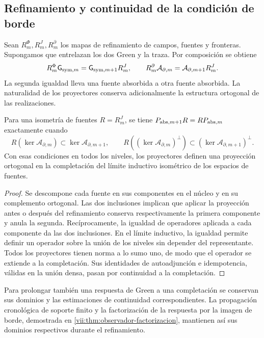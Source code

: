 \subsection{Refinamiento y continuidad de la condición de borde}
\label{vii:subsec:refinamiento-absorcion}

Sean \(R_m^\Phi,R_m^J,R_m^\partial\) los mapas de refinamiento de
campos, fuentes y fronteras. Supongamos que entrelazan los dos Green y la
traza. Por composición se obtiene
\begin{equation}
 R_m^\Phi \mathsf{G}_{{\rm sym},m}=\mathsf{G}_{{\rm sym},m+1}R_m^J,\qquad
 R_m^\partial\mathcal A_{\partial,m}
 =\mathcal A_{\partial,m+1}R_m^J.
 \label{vii:eq:refinamiento-lectura-absorcion}
\end{equation}
La segunda igualdad lleva una fuente absorbida a otra fuente absorbida.
La naturalidad de los proyectores conserva adicionalmente la estructura
ortogonal de las realizaciones.

\begin{proposition}
\label{vii:prop:naturalidad-proyeccion-absorcion}
Para una isometría de fuentes \(R=R_m^J\), se tiene
\(P_{{\rm abs},m+1}R=RP_{{\rm abs},m}\) exactamente cuando
\[
 R(\ker\mathcal A_{\partial,m})
       \subset\ker\mathcal A_{\partial,m+1},\qquad
 R((\ker\mathcal A_{\partial,m})^\perp)
       \subset(\ker\mathcal A_{\partial,m+1})^\perp.
\]
Con esas condiciones en todos los niveles, los proyectores definen una
proyección ortogonal en la completación del límite inductivo isométrico
de los espacios de fuentes.
\end{proposition}
\begin{proof}
Se descompone cada fuente en sus componentes en el núcleo y en su
complemento ortogonal. Las dos inclusiones implican que aplicar la
proyección antes o después del refinamiento conserva respectivamente la
primera componente y anula la segunda. Recíprocamente, la igualdad de
operadores aplicada a cada componente da las dos inclusiones.
En el límite inductivo, la igualdad permite definir un operador sobre la
unión de los niveles sin depender del representante. Todos los proyectores
tienen norma a lo sumo uno, de modo que el operador se extiende a la
completación. Sus identidades de autoadjunción e idempotencia, válidas en
la unión densa, pasan por continuidad a la completación.
\end{proof}

Para prolongar también una respuesta de Green a una completación se
conservan sus dominios y las estimaciones de continuidad correspondientes.
La propagación cronológica de soporte finito y la factorización de la
respuesta por la imagen de borde, demostrada en
\ref{vii:thm:observador-factorizacion}, mantienen así sus dominios
respectivos durante el refinamiento.

